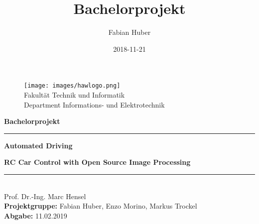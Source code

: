 \documentclass[a4paper,12pt]{article}
\title{Bachelorprojekt}
\date{2018-11-21}
\author{Fabian Huber}
\begin{document}
\begin{titlepage}
\begin{figure}[h!]
  \begin{flushright}
  \begin{spacing}{1.5}
  \texttt{[image: images/hawlogo.png]}
  \label{fig:hawlogo}\\
  \small Fakultät Technik und Informatik\\
  \small Department Informations- und Elektrotechnik
  \end{spacing}
  \end{flushright}
\end{figure}
\textbf{\large Bachelorprojekt}
\begin{center}\noindent\textcolor{blue(ncs)}{\rule{13.5cm}{0.5mm}}\end{center}
\begin{spacing}{4.5}
\textbf{\huge Automated Driving}
\end{spacing}
\textbf{\large\indent RC Car Control with Open Source Image Processing}
\begin{center}\noindent\textcolor{blue(ncs)}{\rule{13.5cm}{0.5mm}}\end{center}
\begin{spacing}{1.15}
\vspace*{\fill}
\noindent
\textnormal{\\
  Prof. Dr.-Ing. Marc Hensel \\
  \textbf{Projektgruppe:} Fabian Huber, Enzo Morino, Markus Trockel \\
  \textbf{Abgabe:} 11.02.2019 \\
}
\end{spacing}
\end{titlepage}


	\newpage
	
	
  \newpage
  \tableofcontents
  \newpage




	\newpage
  
 
 	\newpage
  
  
  \newpage  
  

%  
  
\end{document}
